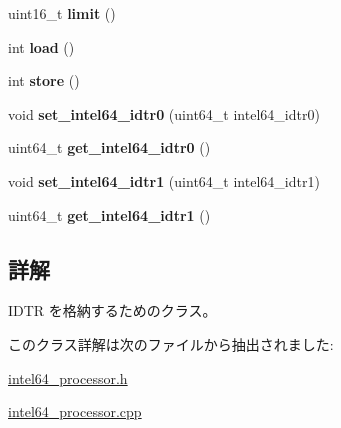 \begin{DoxyCompactItemize}
\item 
\hypertarget{classintel64__idtr_a048373431da288ba011a5538d8cf59c2}{}uint16\+\_\+t {\bfseries limit} ()\label{classintel64__idtr_a048373431da288ba011a5538d8cf59c2}

\item 
\hypertarget{classintel64__idtr_ad2dd8ad29b2239ca05382dd9af4d1fec}{}int {\bfseries load} ()\label{classintel64__idtr_ad2dd8ad29b2239ca05382dd9af4d1fec}

\item 
\hypertarget{classintel64__idtr_ab02ac72c6686406a2aa9906af7852b51}{}int {\bfseries store} ()\label{classintel64__idtr_ab02ac72c6686406a2aa9906af7852b51}

\item 
\hypertarget{classintel64__idtr_a4d0a1adf0406e4000260d81ed3f0173b}{}void {\bfseries set\+\_\+intel64\+\_\+idtr0} (uint64\+\_\+t intel64\+\_\+idtr0)\label{classintel64__idtr_a4d0a1adf0406e4000260d81ed3f0173b}

\item 
\hypertarget{classintel64__idtr_a498816d83051bc4706fd990e9055ba31}{}uint64\+\_\+t {\bfseries get\+\_\+intel64\+\_\+idtr0} ()\label{classintel64__idtr_a498816d83051bc4706fd990e9055ba31}

\item 
\hypertarget{classintel64__idtr_a1306cbebbff931ddd635dd80e104442f}{}void {\bfseries set\+\_\+intel64\+\_\+idtr1} (uint64\+\_\+t intel64\+\_\+idtr1)\label{classintel64__idtr_a1306cbebbff931ddd635dd80e104442f}

\item 
\hypertarget{classintel64__idtr_aacafe385f9727f8948ca0c6208040742}{}uint64\+\_\+t {\bfseries get\+\_\+intel64\+\_\+idtr1} ()\label{classintel64__idtr_aacafe385f9727f8948ca0c6208040742}

\end{DoxyCompactItemize}


\subsection{詳解}
I\+D\+T\+R を格納するためのクラス。 

このクラス詳解は次のファイルから抽出されました\+:\begin{DoxyCompactItemize}
\item 
\hyperlink{intel64__processor_8h}{intel64\+\_\+processor.\+h}\item 
\hyperlink{intel64__processor_8cpp}{intel64\+\_\+processor.\+cpp}\end{DoxyCompactItemize}

